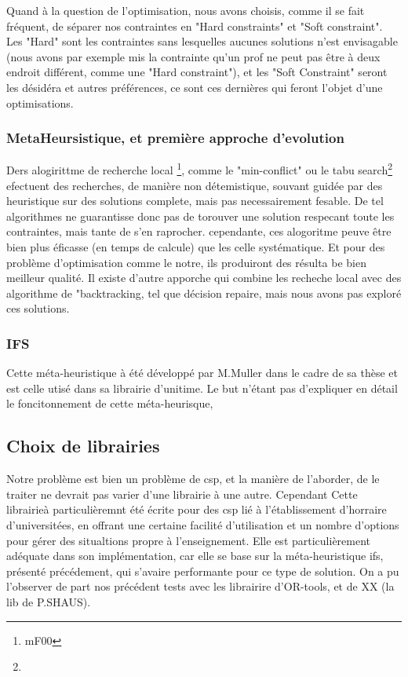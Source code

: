 Quand à la question de l'optimisation, nous avons choisis, comme il se fait fréquent, de séparer nos contraintes en "Hard constraints" et "Soft constraint".  Les "Hard" sont les contraintes sans lesquelles aucunes solutions n'est envisagable (nous avons par exemple mis la contrainte qu'un prof ne peut pas être à deux endroit différent, comme une "Hard constraint"), et les "Soft Constraint" seront les désidéra et autres préférences, ce sont ces dernières qui feront l'objet d'une optimisations. 
\subsubsection{MetaHeursistique, et première approche d'evolution}
Ders alogirittme de recherche local \footnote{mF00}, comme le "min-conflict" ou le tabu search\footnote{} efectuent des recherches, de manière non détemistique, souvant guidée par des heuristique sur des solutions complete, mais pas necessairement fesable.  De tel algorithmes ne guarantisse donc pas de torouver une solution respecant toute les contraintes, mais tante de s'en raprocher. cependante, ces alogoritme peuve être bien plus éficasse (en temps de calcule) que les celle systématique. Et pour des problème d'optimisation comme le notre, ils produiront des résulta be bien meilleur qualité.
Il existe d'autre apporche qui combine les recheche local avec des algorithme de "backtracking, tel que décision repaire, mais nous avons pas exploré ces solutions.

\subsubsection{IFS}
Cette méta-heuristique à été développé par M.Muller dans le cadre de sa thèse et est celle utisé dans sa librairie d'unitime. 
Le but n'étant pas d'expliquer en détail le foncitonnement de cette méta-heurisque, 

\subsection{Choix de librairies}
Notre problème est bien un problème de csp, et la manière de l'aborder, de le traiter ne devrait pas varier d'une librairie à une autre.  Cependant Cette librairieà particulièremnt été écrite pour des csp lié à l'établissement d'horraire d'universitées, en offrant une certaine facilité d'utilisation et un nombre d'options pour gérer des situaltions propre à l'enseignement.
Elle est particulièrement adéquate dans son implémentation, car elle se base sur la méta-heuristique ifs, présenté précédement, qui s'avaire performante pour ce type de solution.  On a pu l'observer de part nos précédent tests avec les librairire d'OR-tools, et de XX (la lib de P.SHAUS).

